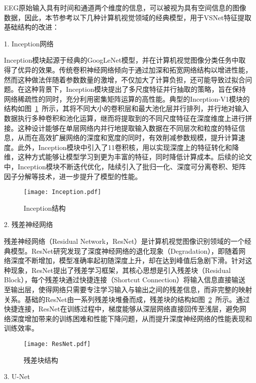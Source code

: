EEG原始输入具有时间和通道两个维度的信息，可以被视为具有空间信息的图像数据，因此，本节参考以下几种计算机视觉领域的经典模型，用于VSNet特征提取基础结构的改进：

1. Inception网络

Inception模块起源于经典的GoogLeNet模型\cite{szegedy2015going}，并在计算机视觉图像分类任务中取得了优异的效果。传统卷积神经网络倾向于通过加深和拓宽网络结构以增进性能，然而这种做法伴随着参数数量的激增，不仅加大了计算负担，还可能导致过拟合问题。在这种背景下，Inception模块提出了多尺度特征并行抽取的策略，旨在保持网络稀疏性的同时，充分利用密集矩阵运算的高性能。典型的Inception-V1模块的结构如图~\ref{fig:Inception}~所示，其将不同大小的卷积层和最大池化层并行排列，并行地对输入数据执行多种卷积和池化运算，继而将提取到的不同尺度特征在深度维度上进行拼接。这种设计能够在单层网络内并行地提取输入数据在不同层次和粒度的特征信息，从而在高效扩展网络的深度和宽度的同时，有效削减参数规模，提升计算速度。此外，Inception模块中引入了1\times1卷积核，用以实现深度上的特征转化和降维，这种方式能够让模型学习到更为丰富的特征，同时降低计算成本。后续的论文中，Inception模块不断迭代优化，陆续引入了批归一化、深度可分离卷积、矩阵因子分解等技术，进一步提升了模型的性能\cite{szegedy2016rethinking}\cite{szegedy2017inception}。
\begin{figure}
  \centering
  \texttt{[image: Inception.pdf]}
  \caption{Inception结构}
  \label{fig:Inception}
\end{figure}

2. 残差神经网络

残差神经网络（Residual Network，ResNet）\cite{he2016deep}是计算机视觉图像识别领域的一个经典模型。ResNet研究发现了深度神经网络的退化现象（Degradation），即随着网络深度不断增加，模型准确率起初随深度上升，却在达到峰值后急剧下滑。针对这种现象，ResNet提出了残差学习框架，其核心思想是引入残差块（Residual Block），每个残差块通过快捷连接（Shortcut Connection）将输入信息直接输送至输出层，使得网络只需要专注学习输入与输出之间的残差信息，而非完整的映射关系。基础的ResNet由一系列残差块堆叠而成，残差块的结构如图~\ref{fig:ResNet}~所示。通过快捷连接，ResNet在训练过程中，梯度能够从深层网络直接回传至浅层，避免网络深度增加带来的训练困难和性能下降问题，从而提升深度神经网络的性能表现和训练效率。
\begin{figure}
  \centering
  \texttt{[image: ResNet.pdf]}
  \caption{残差块结构}
  \label{fig:ResNet}
\end{figure}

3. U-Net


